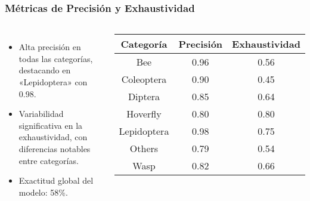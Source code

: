 \begin{frame}
    \frametitle{Métricas de Precisión y Exhaustividad}
    \vspace*{-0.5cm}
    \begin{columns}
        \begin{itemize}
            \item Alta precisión en todas las categorías, destacando en «Lepidoptera» con 0.98.
            \item Variabilidad significativa en la exhaustividad, con diferencias notables entre categorías.
            \item Exactitud global del modelo: 58\%.
        \end{itemize}
    \vspace*{-0.5cm}
    \begin{center}\small
        \begin{tabular}{ccc}
            \toprule
            \textbf{Categoría} & \textbf{Precisión}  &  \textbf{Exhaustividad}\\ 
            \midrule
            Bee &  0.96 &  0.56 \\
            Coleoptera &  0.90 &  0.45 \\
            Diptera &  0.85 &  0.64 \\
            Hoverfly &  0.80 &  0.80 \\
            Lepidoptera &  0.98 &  0.75 \\
            Others &  0.79 &  0.54 \\
            Wasp &  0.82 &  0.66 \\
            \bottomrule
        \end{tabular}
    \end{center}
\end{columns}
\end{frame}

